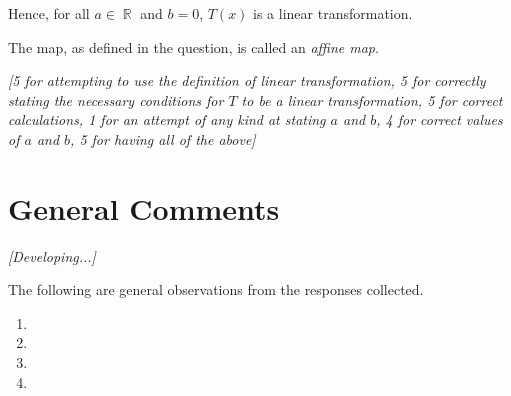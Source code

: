 \documentclass[answers,11pt]{exam}
\theoremstyle{definition}
\DeclareMathOperator{\R}{\mathbb{R}}
\DeclareMathOperator{\1}{\mathbbm{1}}
\begin{document}
\begin{questions}
\begin{solution}
	Hence, for all $a \in \R$ and $b=0$, $T(x)$ is a linear transformation.
	
	The map, as defined in the question, is called an \textit{affine map}.
	
	\textit{[5 for attempting to use the definition of linear transformation, 5 for correctly stating the necessary conditions for $T$ to be a linear transformation, 5 for correct calculations, 1 for an attempt of any kind at stating $a$ and $b$, 4 for correct values of $a$ and $b$, 5 for having all of the above]}
\end{solution}



\end{questions}


\clearpage


\section*{General Comments}

\textit{[Developing...]}


The following are general observations from the responses collected.



\begin{enumerate}
	\item 
	
	
	\item 
	
	
	\item 
	
	
	
	\item  
\end{enumerate}
\end{document}
